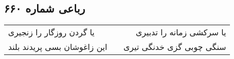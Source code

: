 \begin{center}
\section*{رباعی شماره ۶۶۰}
\label{sec:sh660}
\begin{longtable}{l p{0.5cm} r}
یا گردن روزگار را زنجیری
&&
یا سرکشی زمانه را تدبیری
\\
این زاغوشان بسی پریدند بلند
&&
سنگی چوبی گزی خدنگی تیری
\\
\end{longtable}
\end{center}
